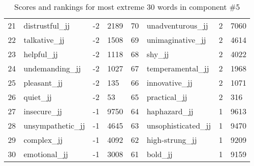 \begin{table}[tbp]
\begin{tabular}{| rlr@{.}l | rlr@{.}l |}
    21 & distrustful\_jj & -2 & 2189    &    70 & unadventurous\_jj & 2 & 7060 \\
    22 & talkative\_jj & -2 & 1508    &    69 & unimaginative\_jj & 2 & 4614 \\
    23 & helpful\_jj & -2 & 1118    &    68 & shy\_jj & 2 & 4022 \\
    24 & undemanding\_jj & -2 & 1027    &    67 & temperamental\_jj & 2 & 1968 \\
    25 & pleasant\_jj & -2 & 135    &    66 & innovative\_jj & 2 & 1071 \\
    26 & quiet\_jj & -2 & 53    &    65 & practical\_jj & 2 & 316 \\
    27 & insecure\_jj & -1 & 9750    &    64 & haphazard\_jj & 1 & 9613 \\
    28 & unsympathetic\_jj & -1 & 4645    &    63 & unsophisticated\_jj & 1 & 9470 \\
    29 & complex\_jj & -1 & 4092    &    62 & high-strung\_jj & 1 & 9209 \\
    30 & emotional\_jj & -1 & 3008    &    61 & bold\_jj & 1 & 9159 \\
    \hline
    \end{tabular}
    \caption{Scores and rankings for most extreme 30 words in component \#5} 
\end{table}
\clearpage
